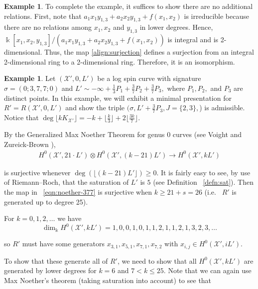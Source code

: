 \documentclass{amsart}
\theoremstyle{plain}
\theoremstyle{definition}
\newtheorem{example}[thm]{Example}
\theoremstyle{remark}
\numberwithin{equation}{section}
\newcommand\Bk{{\Bbbk}}
\newcommand\sx{\mathscr X}
\newcommand{\halfcan}{L}
\begin{document}
\begin{example}
To complete the example, it suffices to show there are no
additional relations. First, note that $a_1 x_1 y_{1, 3} + a_2 x_2
y_{1, 3} + f(x_1, x_2)$ is irreducible because there are no
relations among $x_1, x_2$ and $y_{1, 3}$ in lower degrees. Hence,
$\Bk[x_1, x_2, y_{1, 3}] / (a_1 x_1 y_{1, 3} + a_2 x_2 y_{1, 3} +
f(x_1, x_2))$ is integral and is 2-dimensional. Thus, the map
\eqref{align:surjection} defines a surjection from an integral
2-dimensional ring to a 2-dimensional ring. Therefore, it is an 
isomorphism.
\end{example}


\begin{example}
\label{eg:base-0-377}
Let $(\sx', 0, \halfcan')$ be a log spin curve with signature $\sigma =
(0; 3, 7, 7; 0)$ and $\halfcan' \sim -\infty + \frac{1}{3} P_1 +
\frac{3}{7} P_2 + \frac{3}{7} P_3,$ where $P_1, P_2,$ and $P_3$ are
distinct points. In this example, we will exhibit a minimal
presentation for $R' = R(\sx', 0, \halfcan')$ and show the triple
$(\sigma, \halfcan' + \frac{3}{7} P_3, J = \{2, 3\},$) is admissible.
Notice that $\deg \lfloor k K_{\sx'} \rfloor= -k + \lfloor \frac{k}{3}
\rfloor + 2 \lfloor \frac{3k}{7} \rfloor$.

By the Generalized Max Noether Theorem for genus 0 curves (see Voight
and Zureick-Brown \cite[Lemma 3.1.1]{vzb:stacky}),
\begin{align}
\label{eqn:noether-377}
	H^0 (\sx', 21 \cdot \halfcan') \otimes H^0 (\sx',
	(k - 21) \halfcan') \rightarrow H^0 (\sx',
	k \halfcan')
\end{align}

\noindent
is surjective whenever $\deg (\lfloor (k - 21) \halfcan' \rfloor)
\geq 0$. It is fairly easy to see, by use of Riemann--Roch, that
the saturation of $\halfcan'$ is $5$ (see Definition ~\ref{defn:sat}).
Then the map in ~\eqref{eqn:noether-377} is surjective when $k \geq
21 + s = 26$ (i.e.~ $R'$ is generated up to degree 25).

For $k = 0, 1, 2, \ldots$ we have
\[
	\dim_\Bk H^0 (\sx', k \halfcan') = 1, 0, 0, 1, 0, 1, 1, 2, 1, 1, 2, 1, 3, 2, 3, \ldots
\]

\noindent
so $R'$ must have some generators $x_{3, 1}, x_{5, 1}, x_{7, 1},
x_{7, 2}$ with $x_{i, j} \in H^0(\sx', i \halfcan')$.

To show that these generate all of $R'$, we need to show that all
$H^0 (\sx', k \halfcan')$ are generated by lower degrees for $k = 6$
and $7 < k \leq 25$. Note that we can again use Max Noether's theorem
(taking saturation into account) to see that


\end{example}
\end{document}
